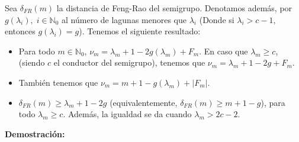 \documentclass[11pt,spanish]{book}
\newcommand{\la}{\lambda}
\begin{document}
Sea $\delta_{FR}(m)$ la distancia de Feng-Rao del semigrupo. Denotamos además, por $g(\lambda_i),\;i\in\mathbb{N}_0$ al número de lagunas menores que $\lambda_i$ (Donde si $\lambda_i>c-1$, entonces $g(\lambda_i)=g$). Tenemos el siguiente resultado:
\begin{itemize}
    \item Para todo $m\in\mathbb{N}_0$, $\nu_m=\lambda_m+1-2g(\lambda_m)+F_m$. En caso que $\lambda_m\geq c$, (siendo $c$ el conductor del semigrupo), tenemos que $\nu_m=\lambda_m+1-2g+F_m$.
    \item También tenemos que $\nu_m=m+1-g(\la_m)+|F_m|$.
    \item $\delta_{FR}(m)\geq \lambda_m +1-2g$ (equivalentemente, $\delta_{FR}(m)\geq m +1-g$), para todo $\lambda_m\geq c$. Además, la igualdad se da cuando $\lambda_m> 2c-2$.
\end{itemize}
\textbf{Demostración:}
\end{document}

